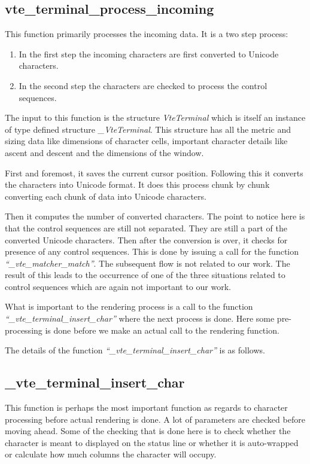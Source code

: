 \subsection{vte\_terminal\_process\_incoming}
This function primarily processes the incoming data. It is a two step process:

\begin{enumerate}
\item In the first step the incoming characters are first converted to Unicode characters.
\item In the second step the characters are checked to process the control sequences.
\end{enumerate}

The input to this function is the structure \textit{VteTerminal} which is itself an instance of type defined structure \textit{\_VteTerminal}. This structure has all the metric and sizing data like dimensions of character cells, important character details like ascent and descent and the dimensions of the window.

First and foremost, it saves the current cursor position. Following this it converts the characters into Unicode format. It does this process chunk by chunk converting each chunk of data into Unicode characters.

Then it computes the number of converted characters. The point to notice here is that the control sequences are still not separated. They are still a part of the converted Unicode characters. Then after the conversion is over, it checks for presence of any control sequences. This is done by issuing a call for the function \textit{``\_vte\_matcher\_match''}. The subsequent flow is not related to our work. The result of this leads to the occurrence of one of the three situations related to control sequences which are again not important to our work.

What is important to the rendering process is a call to the function \\\textit{``\_vte\_terminal\_insert\_char''} where the next process is done. Here some pre-processing is done before we make an actual call to the rendering function.
	
The details of the function \textit{``\_vte\_terminal\_insert\_char''} is as follows.

\subsection{\_vte\_terminal\_insert\_char}
This function is perhaps the most important function as regards to character processing before actual rendering is done. A lot of parameters are checked before moving ahead. Some of the checking that is done here is to check whether the character is meant to displayed on the status line or whether it is auto-wrapped or calculate how much columns the character will occupy.

